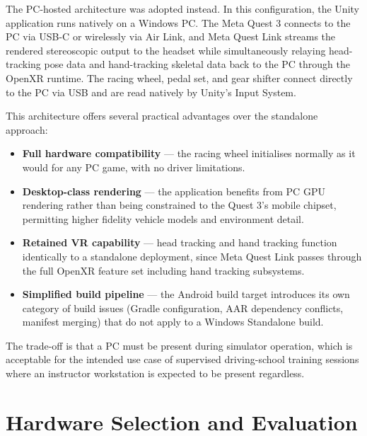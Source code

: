 The PC-hosted architecture was adopted instead. In this configuration, the Unity application runs natively on a Windows PC. The Meta Quest 3 connects to the PC via USB-C or wirelessly via Air Link, and Meta Quest Link streams the rendered stereoscopic output to the headset while simultaneously relaying head-tracking pose data and hand-tracking skeletal data back to the PC through the OpenXR runtime. The racing wheel, pedal set, and gear shifter connect directly to the PC via USB and are read natively by Unity's Input System.

This architecture offers several practical advantages over the standalone approach:
\begin{itemize}
    \item \textbf{Full hardware compatibility} — the racing wheel initialises normally as it would for any PC game, with no driver limitations.
    \item \textbf{Desktop-class rendering} — the application benefits from PC GPU rendering rather than being constrained to the Quest 3's mobile chipset, permitting higher fidelity vehicle models and environment detail.
    \item \textbf{Retained VR capability} — head tracking and hand tracking function identically to a standalone deployment, since Meta Quest Link passes through the full OpenXR feature set including hand tracking subsystems.
    \item \textbf{Simplified build pipeline} — the Android build target introduces its own category of build issues (Gradle configuration, AAR dependency conflicts, manifest merging) that do not apply to a Windows Standalone build.
\end{itemize}

The trade-off is that a PC must be present during simulator operation, which is acceptable for the intended use case of supervised driving-school training sessions where an instructor workstation is expected to be present regardless.

\section{Hardware Selection and Evaluation}

